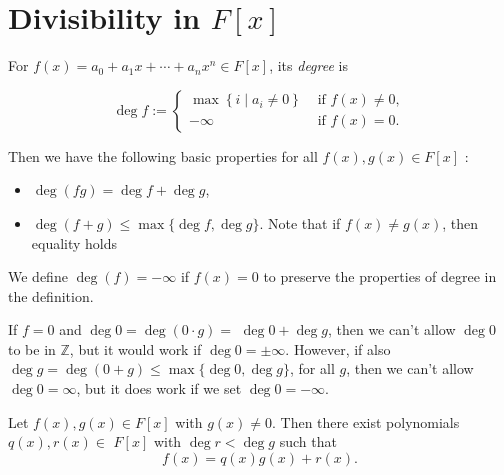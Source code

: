 \section{Divisibility in \(F[x]\)}

\begin{definition}[Degree]
  For \(f(x)=a_0+a_1 x+\cdots+a_n x^n \in F[x]\), its \emph{degree} is

\[
\operatorname{deg} f:= \begin{cases}\max \left\{i \mid a_i \neq 0\right\} & \text { if } f(x) \neq 0, \\ -\infty & \text { if } f(x)=0 .\end{cases}
\]

Then we have the following basic properties for all \(f(x), g(x) \in F[x]\) :
\begin{itemize}
\item[-] \(\operatorname{deg}(f g)=\operatorname{deg} f+\operatorname{deg} g\),
\item[-] \(\operatorname{deg}(f+g) \leq \max \{\operatorname{deg} f, \operatorname{deg} g\}\). Note that if \(f(x) \neq g(x)\), then equality holds
\end{itemize}
\end{definition}

\begin{remark}
  We define \(\operatorname{deg}(f) = - \infty\) if \(f(x) = 0\) to preserve the properties of degree in the definition. 

If \(f=0\) and \(\operatorname{deg} 0=\operatorname{deg}(0 \cdot g)=\) \(\operatorname{deg} 0+\operatorname{deg} g\), then we can't allow \(\operatorname{deg} 0\) to be in \(\mathbb{Z}\), but it would work if \(\operatorname{deg} 0= \pm \infty\). However, if also \(\operatorname{deg} g=\operatorname{deg}(0+g) \leq \max \{\operatorname{deg} 0, \operatorname{deg} g\}\), for all \(g\), then we can't allow \(\operatorname{deg} 0=\infty\), but it does work if we set \(\operatorname{deg} 0=-\infty\).
\end{remark}


\begin{proposition}
Let \(f(x), g(x) \in F[x]\) with \(g(x) \neq 0\). Then there exist polynomials \(q(x), r(x) \in\) \(F[x]\) with \(\operatorname{deg} r<\operatorname{deg} g\) such that
\[
f(x)=q(x) g(x)+r(x) .
\]
\end{proposition}

